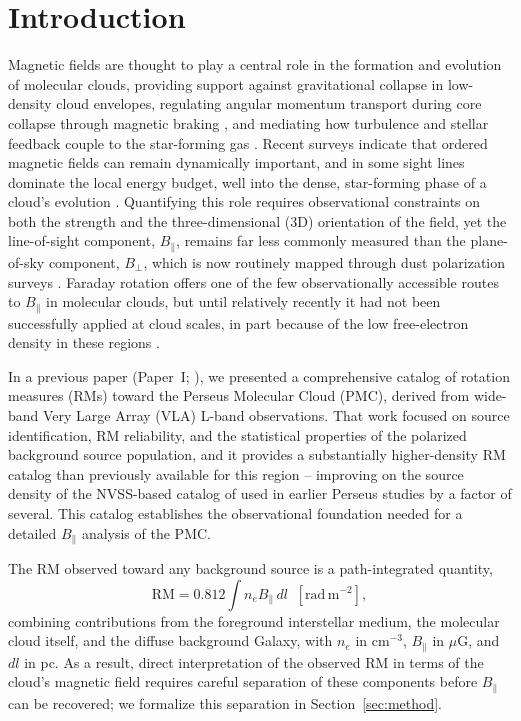 \documentclass[twocolumn]{aastex631}
\begin{document}

\section{Introduction}
\label{sec:intro}

Magnetic fields are thought to play a central role in the formation and evolution of molecular clouds, providing support against gravitational collapse in low-density cloud envelopes, regulating angular momentum transport during core collapse through magnetic braking \citep{pudritz2019}, and mediating how turbulence and stellar feedback couple to the star-forming gas \citep{krumholz2019}. Recent surveys indicate that ordered magnetic fields can remain dynamically important, and in some sight lines dominate the local energy budget, well into the dense, star-forming phase of a cloud's evolution \citep{barnes2025}. Quantifying this role requires observational constraints on both the strength and the three-dimensional (3D) orientation of the field, yet the line-of-sight component, $B_\parallel$, remains far less commonly measured than the plane-of-sky component, $B_\perp$, which is now routinely mapped through dust polarization surveys \citep{planck2016, pattle2023}. Faraday rotation offers one of the few observationally accessible routes to $B_\parallel$ in molecular clouds, but until relatively recently it had not been successfully applied at cloud scales, in part because of the low free-electron density in these regions \citep{wolleben2004}.

In a previous paper (Paper~I; \citealt{hajizadeh2026comprehensive}), we presented a comprehensive catalog of rotation measures (RMs) toward the Perseus Molecular Cloud (PMC), derived from wide-band Very Large Array (VLA) L-band observations. That work focused on source identification, RM reliability, and the statistical properties of the polarized background source population, and it provides a substantially higher-density RM catalog than previously available for this region -- improving on the source density of the NVSS-based catalog of \citet{taylor2009} used in earlier Perseus studies by a factor of several. This catalog establishes the observational foundation needed for a detailed $B_\parallel$ analysis of the PMC.

The RM observed toward any background source is a path-integrated quantity,
\begin{equation}
\label{eq:rm-basic}
    \mathrm{RM} = 0.812 \int n_e B_\parallel \, dl \;\;[\mathrm{rad\,m^{-2}}],
\end{equation}
combining contributions from the foreground interstellar medium, the molecular cloud itself, and the diffuse background Galaxy, with $n_e$ in $\mathrm{cm^{-3}}$, $B_\parallel$ in $\mu$G, and $dl$ in pc. As a result, direct interpretation of the observed RM in terms of the cloud's magnetic field requires careful separation of these components before $B_\parallel$ can be recovered; we formalize this separation in Section~\ref{sec:method}.
\end{document}
